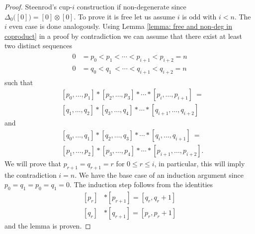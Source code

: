 \begin{proof}
	Steenrod's cup-$i$ construction if non-degenerate since $\Delta_0\big([0]\big) = [0] \otimes [0]$. To prove it is free let us assume $i$ is odd with $i < n$. The $i$ even case is done analogously. Using Lemma \ref{lemma: free and non-deg in coproduct} in a proof by contradiction we can assume that there exist at least two distinct sequences
	\begin{align*}
	\begin{split}
	0 &= p_0 < p_1   < \cdots < p_{i+1} < p_{i+2} = n \\
	0 &= q_0 < q_1 \,<  \cdots < q_{i+1} < q_{i+2} = n
	\end{split}
	\end{align*}
	such that
	\[
	\begin{split}
	&[ {p_0}, \dots, {p_1} ] \ast [ {p_2}, \dots, {p_3} ] \ast \cdots \ast [ {p_{i}}, \dots, {p_{i+1}} ]\ = \\
	&[ {q_1}, \dots, {q_2} ] \ast [ {q_3}, \dots, {q_4} ] \ast \cdots \ast [ {q_{i+1}}, \dots, {q_{i+2}} ]
	\end{split}
	\]
	and
	\[
	\begin{split}
	&[ {q_0}, \dots, {q_1} ] \ast [ {q_2}, \dots, {q_3} ] \ast \cdots \ast [ {q_{i}}, \dots, {q_{i+1}} ]\ = \\
	&[ {p_1}, \dots, {p_2} ] \ast [ {p_3}, \dots, {p_4} ] \ast \cdots \ast [ {p_{i+1}}, \dots, {p_{i+2}} ].
	\end{split}
	\]
	We will prove that $p_{r+1} = q_{r+1} = r$ for $0 \leq r \leq i$, in particular, this will imply the contradiction $i = n$. We have the base case of an induction argument since ${p_0} = {q_1} = {p_0} = {q_1} = 0$. The induction step follows from the identities
	\[
	\begin{split}
	[p_r] &\ast [p_{r+1}] = [q_r, q_{r}+1]\\
	[q_r] &\ast [q_{r+1}] = [p_r, p_{r}+1]
	\end{split}
	\]
	and the lemma is proven.
\end{proof}